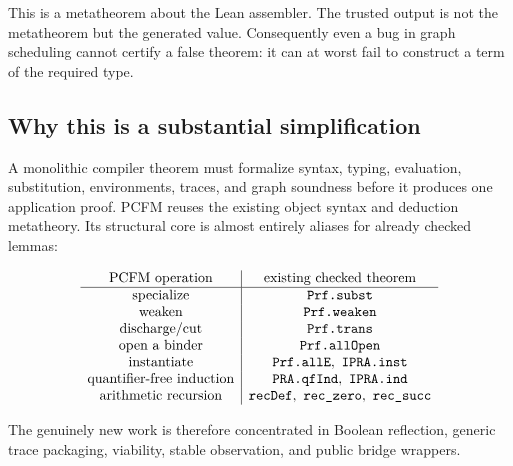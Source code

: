 This is a metatheorem about the Lean assembler.  The trusted output is not the
metatheorem but the generated  value.  Consequently even a bug
in graph scheduling cannot certify a false theorem: it can at worst fail to
construct a term of the required type.

\subsection{Why this is a substantial simplification}

A monolithic compiler theorem must formalize syntax, typing, evaluation,
substitution, environments, traces, and graph soundness before it produces one
application proof.  PCFM reuses the existing object syntax and deduction
metatheory.  Its structural core is almost entirely aliases for already
checked lemmas:

\[
\begin{array}{c|c}
\text{PCFM operation} & \text{existing checked theorem}\\
\hline
\text{specialize} & \code{Prf.subst}\\
\text{weaken} & \code{Prf.weaken}\\
\text{discharge/cut} & \code{Prf.trans}\\
\text{open a binder} & \code{Prf.allOpen}\\
\text{instantiate} & \code{Prf.allE},\ \code{IPRA.inst}\\
\text{quantifier-free induction} & \code{PRA.qfInd},\ \code{IPRA.ind}\\
\text{arithmetic recursion} & \code{recDef},\ \code{rec_zero},\ \code{rec_succ}
\end{array}
\]

The genuinely new work is therefore concentrated in Boolean reflection,
generic trace packaging, viability, stable observation, and public bridge
wrappers.
